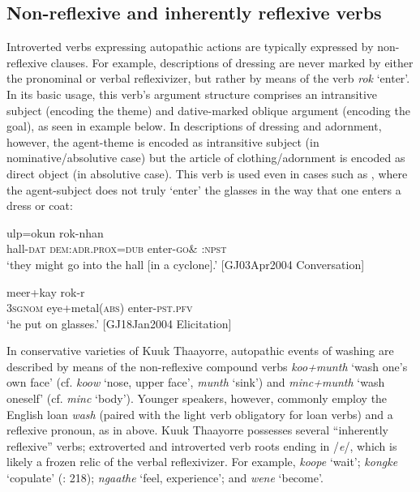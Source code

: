 \documentclass[output=paper]{langscibook}
\begin{document}
\subsection{Non-reflexive and inherently reflexive verbs}\label{sec:Gaby:3.3}
Introverted verbs expressing autopathic actions are typically expressed by non-reflexive clauses. For example, descriptions of dressing are never marked by either the pronominal or verbal reflexivizer, but rather by means of the verb \textit{rok} ‘enter’. In its basic usage, this verb’s argument structure comprises an intransitive subject (encoding the theme) and dative-marked oblique argument (encoding the goal), as seen in example  below. In descriptions of dressing and adornment, however, the agent-theme is encoded as intransitive subject (in nominative/absolutive case) but the article of clothing/adornment is encoded as direct object (in absolutive case). This verb is used even in cases such as , where the agent-subject does not truly ‘enter’ the glasses in the way that one enters a dress or coat:

\ea 
    \label{ex:Gaby:14}
      {ulp=okun}  {rok-nhan}\\
    hall-\textsc{dat}  \textsc{dem:adr.prox}=\textsc{dub}  enter-\textsc{go\&} \textsc{:npst}\\
    \glt ‘they might go into the hall [in a cyclone].’ [GJ03Apr2004 Conversation]
    \z
    


  

\ea 
    \label{ex:Gaby:15}
      {meer+kay}  {rok-r}\\
    \textsc{3sg}\textsc{nom}  eye+metal(\textsc{abs)}  enter-\textsc{pst.pfv}\\
    \glt ‘he put on glasses.’ [GJ18Jan2004 Elicitation]
    \z

In conservative varieties of Kuuk Thaayorre, autopathic events of washing are described by means of the non-reflexive compound verbs \textit{koo+munth} ‘wash one’s own face’ (cf. \textit{koow} ‘nose, upper face’, \textit{munth} ‘sink’) and \textit{minc+munth} ‘wash oneself’ (cf. \textit{minc} ‘body’). Younger speakers, however, commonly employ the English loan \textit{wash} (paired with the light verb obligatory for loan verbs) and a reflexive pronoun, as in  above. Kuuk Thaayorre possesses several “inherently reflexive” verbs; extroverted and introverted verb roots ending in /\textit{e}/, which is likely a frozen relic of the verbal reflexivizer. For example, \textit{koope} ‘wait’; \textit{kongke} ‘copulate’ (\citealt{FooteHall1992}: 218); \textit{ngaathe} ‘feel, experience’; and \textit{wene} ‘become’.
\end{document}

